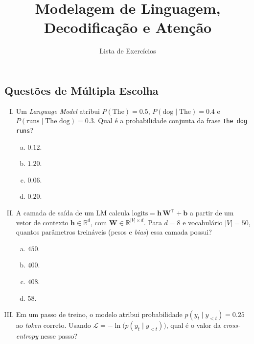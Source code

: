 \documentclass{dlproblemset}
\title{Modelagem de Linguagem, Decodificação e Atenção}
\subtitle{Lista de Exercícios}
\begin{document}
\subsection*{Questões de Múltipla Escolha}

\begin{enumerate}[I)]

\item Um \textit{Language Model} atribui $P(\text{The}) = 0.5$,
$P(\text{dog} \mid \text{The}) = 0.4$ e $P(\text{runs} \mid \text{The dog}) = 0.3$.
Qual é a probabilidade conjunta da frase \texttt{The dog runs}?

\begin{enumerate}[a)]
    \item $0.12$.
    \item $1.20$.
    \item $0.06$.
    \item $0.20$.
\end{enumerate}

\item A camada de saída de um LM calcula $\text{logits} = \mathbf{h}\,\mathbf{W}^{\top} + \mathbf{b}$ a partir de um vetor de
contexto $\mathbf{h} \in \mathbb{R}^{d}$, com $\mathbf{W} \in \mathbb{R}^{|V| \times d}$. Para $d = 8$ e
vocabulário $|V| = 50$, quantos parâmetros treináveis (pesos e \textit{bias}) essa camada possui?

\begin{enumerate}[a)]
    \item $450$.
    \item $400$.
    \item $408$.
    \item $58$.
\end{enumerate}

\item Em um passo de treino, o modelo atribui probabilidade $p(y_t \mid y_{<t}) = 0.25$ ao
\textit{token} correto. Usando $\mathcal{L} = -\ln\bigl(p(y_t \mid y_{<t})\bigr)$, qual é o valor
da \textit{cross-entropy} nesse passo?


\end{enumerate}
\end{document}
